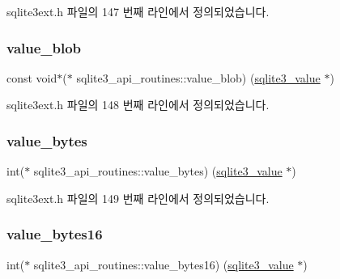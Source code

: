 sqlite3ext.\+h 파일의 147 번째 라인에서 정의되었습니다.

\mbox{\label{structsqlite3__api__routines_ae2c90149043ca50502c7d6b7e1764103}} 
\subsubsection{\texorpdfstring{value\+\_\+blob}{value\_blob}}
{\footnotesize\ttfamily const void$\ast$($\ast$ sqlite3\+\_\+api\+\_\+routines\+::value\+\_\+blob) (\hyperlink{sqlite3_8h_ac2fa1ecdb2290d9af6010edbd1cbc83c}{sqlite3\+\_\+value} $\ast$)}



sqlite3ext.\+h 파일의 148 번째 라인에서 정의되었습니다.

\mbox{\label{structsqlite3__api__routines_aaf6e53b347fe8a81b05f8144c1418022}} 
\subsubsection{\texorpdfstring{value\+\_\+bytes}{value\_bytes}}
{\footnotesize\ttfamily int($\ast$ sqlite3\+\_\+api\+\_\+routines\+::value\+\_\+bytes) (\hyperlink{sqlite3_8h_ac2fa1ecdb2290d9af6010edbd1cbc83c}{sqlite3\+\_\+value} $\ast$)}



sqlite3ext.\+h 파일의 149 번째 라인에서 정의되었습니다.

\mbox{\label{structsqlite3__api__routines_ad1e6349c107a4e9640d0f70a1032d9c9}} 
\subsubsection{\texorpdfstring{value\+\_\+bytes16}{value\_bytes16}}
{\footnotesize\ttfamily int($\ast$ sqlite3\+\_\+api\+\_\+routines\+::value\+\_\+bytes16) (\hyperlink{sqlite3_8h_ac2fa1ecdb2290d9af6010edbd1cbc83c}{sqlite3\+\_\+value} $\ast$)}



